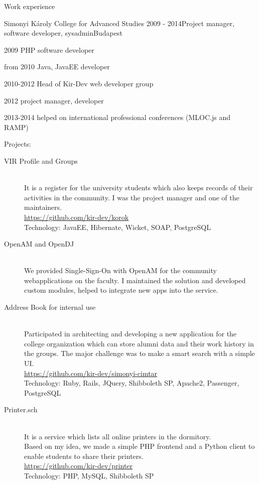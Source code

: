\documentclass{resume} %
\begin{document}
\begin{rSection}{Work experience}
\begin{rSubsection}{Simonyi Károly College for Advanced Studies}
{2009 - 2014}{Project manager, software developer, sysadmin}{Budapest}
\item 2009 PHP software developer
\item from 2010 Java, JavaEE developer
\item 2010-2012 Head of Kir-Dev web developer group
\item 2012 project manager, developer
\item 2013-2014 helped on international professional conferences (MLOC.js and RAMP)
\item Projects:
	\begin{description}
		\item[VIR Profile and Groups] \hfill \\
		It is a register for the university students which also keeps records of
		their activities in the community. I was the project manager and one of the
		maintainers. \\
		\url{https://github.com/kir-dev/korok} \\
		Technology: JavaEE, Hibernate, Wicket, SOAP, PostgreSQL
		\item[OpenAM and OpenDJ] \hfill \\
		We provided Single-Sign-On with OpenAM for the community webapplications on the faculty.
		I maintained the solution and developed custom modules, helped to integrate
		new apps into the service.
		\item[Address Book for internal use] \hfill \\
	  Participated in architecting and developing a new application for the college
	  organization which can store alumni data and their work history in the groups.
	  The major challenge was to make a smart search with a simple UI. \\
	  \url{https://github.com/kir-dev/simonyi-cimtar} \\
		Technology: Ruby, Rails, JQuery, Shibboleth SP, Apache2, Passenger, PostgreSQL
		\item[Printer.sch] \hfill \\
		It is a service which lists all online printers in the dormitory. \\
		Based on my idea, we made a simple PHP frontend and a Python client to enable students
		to share their printers. \\
		\url{https://github.com/kir-dev/printer} \\
		Technology: PHP, MySQL, Shibboleth SP
	\end{description}
\end{rSubsection}


\end{rSection}
\end{document}
